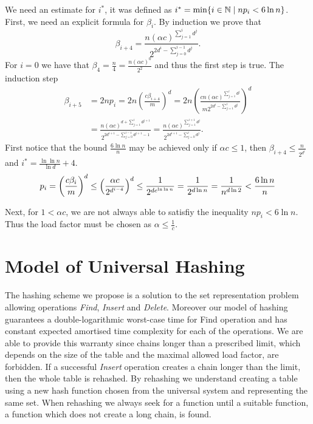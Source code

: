 We need an estimate for $i^*$, it was defined as $i^* = \displaystyle\min \{i \in \mathbb{N} \mid np_i < 6 \ln n\}$. First, we need an explicit formula for $\beta_i$. By induction we prove that $$\beta_{i + 4} = \frac{n \left(\alpha c\right) ^ {\sum_{j = 1}^{i}d ^ j}}{2 ^ {2 d ^ i - \sum_{j = 0}^{i - 1}{d ^ j}}} \textit{.}$$
For $i = 0$ we have that $\beta_4 = \frac{n}{4} = \frac{n\left(\alpha c\right) ^ 0}{2 ^ {2}}$ and thus the first step is true. The induction step
\[
\begin{split}
\beta_{i + 5} 
	& = 2np_i = 2n \left(\frac{c\beta_{i + 4}}{m}\right) ^ d = 2n \left(\frac{cn\left(\alpha c\right) ^ {\sum_{j = 1}^{i}d ^ j}}{m 2 ^ {2 d ^ i - \sum_{j = 1}^{i}d^j}}\right) ^ d \\
	& = \frac{n\left(\alpha c\right) ^ {d + \sum_{j = 1}^{i} d ^ {j + 1}}}{2 ^ {2d ^ {i + 1} - \sum_{j = 0}^{i  -1} d ^ {j + 1} - 1}} = \frac{n \left(\alpha c\right) ^ {\sum_{j = 1}^{i + 1} d ^ j}}{2 ^ {2d ^ {i + 1} - \sum_{j = 0}^{i} d ^ j}} \textit{.}
\end{split}
\]
First notice that the bound $\frac{6 \ln n}{n}$ may be achieved only if $\alpha c \leq 1$, then $\beta_{i + 4} \leq \frac{n}{2 ^ {d ^ i}}$ and $i^* = \frac{\ln \ln n}{\ln d} + 4$.
\[
p_i = \left(\frac{c\beta_i}{m}\right) ^ d \leq \left(\frac{\alpha c}{2 ^ {d ^ {i - 4}}}\right) ^ d \leq \frac{1}{2 ^ {de^{\ln \ln n}}} = \frac{1}{2 ^ {d \ln n}} = \frac{1}{n ^ {d \ln 2}} < \frac{6 \ln n}{n}\\
\]

Next, for $1 < \alpha c$, we are not always able to satisfiy the inequality $np_i < 6 \ln n$. Thus the load factor must be chosen as $\alpha \leq \frac{1}{c}$.

\section{Model of Universal Hashing}
The hashing scheme we propose is a solution to the set representation problem allowing operations \emph{Find}, \emph{Insert} and \emph{Delete}. Moreover our model of hashing guarantees a double-logarithmic worst-case time for Find operation and has constant expected amortised time complexity for each of the operations. We are able to provide this warranty since chains longer than a prescribed limit, which depends on the size of the table and the maximal allowed load factor, are forbidden. If a successful \emph{Insert} operation creates a chain longer than the limit, then the whole table is rehashed. By rehashing we understand creating a table using a new hash function chosen from the universal system and representing the same set. When rehashing we always seek for a function until a suitable function, a function which does not create a long chain, is found. 

